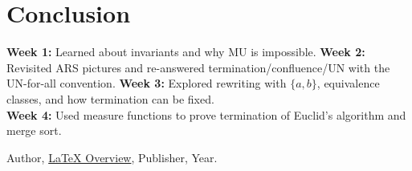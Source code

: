 \documentclass{article}
\theoremstyle{theorem}
\theoremstyle{definition}
\theoremstyle{remark}
\begin{document}
\section{Conclusion}
\textbf{Week 1:} Learned about invariants and why MU is impossible.  
\textbf{Week 2:} Revisited ARS pictures and re-answered termination/confluence/UN with the UN-for-all convention.  
\textbf{Week 3:} Explored rewriting with $\{a,b\}$, equivalence classes, and how termination can be fixed.\\
\textbf{Week 4:} Used measure functions to prove termination of Euclid's algorithm and merge sort.

\begin{thebibliography}{99}
 Author, \href{https://en.wikipedia.org/wiki/LaTeX}{LaTeX Overview}, Publisher, Year.
\end{thebibliography}
\end{document}
